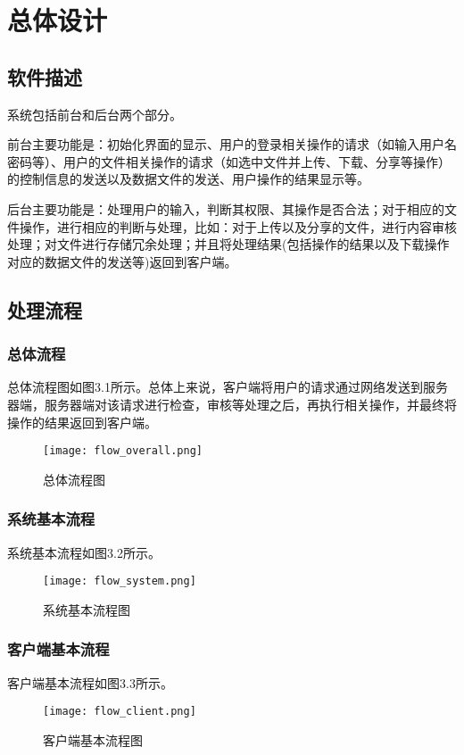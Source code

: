 \chapter{总体设计}
\section{软件描述}
系统包括前台和后台两个部分。

前台主要功能是：初始化界面的显示、用户的登录相关操作的请求（如输入用户名密码等）、用户的文件相关操作的请求（如选中文件并上传、下载、分享等操作）的控制信息的发送以及数据文件的发送、用户操作的结果显示等。

后台主要功能是：处理用户的输入，判断其权限、其操作是否合法；对于相应的文件操作，进行相应的判断与处理，比如：对于上传以及分享的文件，进行内容审核处理；对文件进行存储冗余处理；并且将处理结果(包括操作的结果以及下载操作对应的数据文件的发送等)返回到客户端。

\section{处理流程}
\subsection{总体流程}
总体流程图如图3.1所示。总体上来说，客户端将用户的请求通过网络发送到服务器端，服务器端对该请求进行检查，审核等处理之后，再执行相关操作，并最终将操作的结果返回到客户端。
\begin{figure}[!ht] 
\centering
\texttt{[image: flow\_overall.png]} 
\caption{总体流程图}\label{fig:noted-figure}
\end{figure}

\subsection{系统基本流程} 
系统基本流程如图3.2所示。
\begin{figure}[!ht] 
\centering
\texttt{[image: flow\_system.png]}
\caption{系统基本流程图}\label{fig:noted-figure}
\end{figure} 


\subsection{客户端基本流程}
客户端基本流程如图3.3所示。
\begin{figure}[!ht] 
\centering
\texttt{[image: flow\_client.png]}
\caption{客户端基本流程图}\label{fig:noted-figure}
\end{figure}

